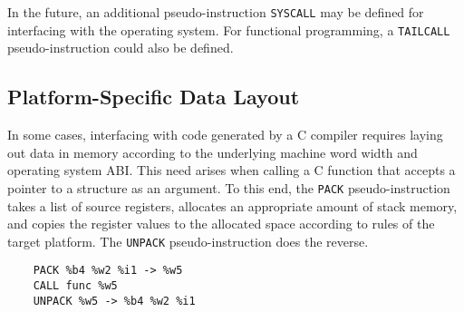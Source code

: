 In the future, an additional pseudo-instruction \texttt{SYSCALL}
may be defined for interfacing with the operating system.
For functional programming, a \texttt{TAILCALL} pseudo-instruction
could also be defined.

\subsection{Platform-Specific Data Layout}

In some cases, interfacing with code generated by a C compiler
requires laying out data in memory according to the
underlying machine word width and operating system ABI.
This need arises when calling a C function that accepts
a pointer to a structure as an argument.
To this end, the \texttt{PACK} pseudo-instruction takes a list
of source registers, allocates an appropriate amount of stack memory,
and copies the register values to the allocated space according
to rules of the target platform. The \texttt{UNPACK} pseudo-instruction
does the reverse.

\begin{verbatim}
    PACK %b4 %w2 %i1 -> %w5
    CALL func %w5
    UNPACK %w5 -> %b4 %w2 %i1
\end{verbatim}
